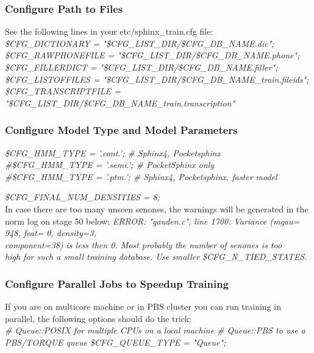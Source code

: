 \documentclass[12pt,a4paper,oneside]{memoir}
\begin{document}
\subsubsection{Configure Path to Files}
 See the following lines in your etc/sphinx\_train.cfg file:\\
\textit{ 
\$CFG\_DICTIONARY     = "\$CFG\_LIST\_DIR/\$CFG\_DB\_NAME.dic";\\
\$CFG\_RAWPHONEFILE   = "\$CFG\_LIST\_DIR/\$CFG\_DB\_NAME.phone";\\
\$CFG\_FILLERDICT     = "\$CFG\_LIST\_DIR/\$CFG\_DB\_NAME.filler";\\
\$CFG\_LISTOFFILES    = "\$CFG\_LIST\_DIR/\${CFG\_DB\_NAME}\_train.fileids";\\
\$CFG\_TRANSCRIPTFILE = "\$CFG\_LIST\_DIR/\${CFG\_DB\_NAME}\_train.transcription"
}

\subsubsection{Configure Model Type and Model Parameters}
\textit{
\$CFG\_HMM\_TYPE = '.cont.'; \# Sphinx4, Pocketsphinx\\
\#\$CFG\_HMM\_TYPE  = '.semi.'; \# PocketSphinx only\\
\#\$CFG\_HMM\_TYPE  = '.ptm.'; \# Sphinx4, Pocketsphinx, faster model\\
}

 
\textit{\$CFG\_FINAL\_NUM\_DENSITIES = 8;}\\

 In case there are too many unseen senones, the warnings will be generated in the norm log on stage 50 below: 
\textit{
ERROR: "gauden.c", line 1700: Variance (mgau= 948, feat= 0, density=3, \\
component=38) is less then 0. Most probably the number of senones is too\\
high for such a small training database. Use smaller \$CFG\_N\_TIED\_STATES.}


\subsubsection{Configure Parallel Jobs to Speedup Training}
If you are on multicore machine or in PBS cluster you can run training in parallel, the following options should do the trick: \\
\textit{
\# Queue::POSIX for multiple CPUs on a local machine
\# Queue::PBS to use a PBS/TORQUE queue
\$CFG\_QUEUE\_TYPE = "Queue";
}
\end{document}
